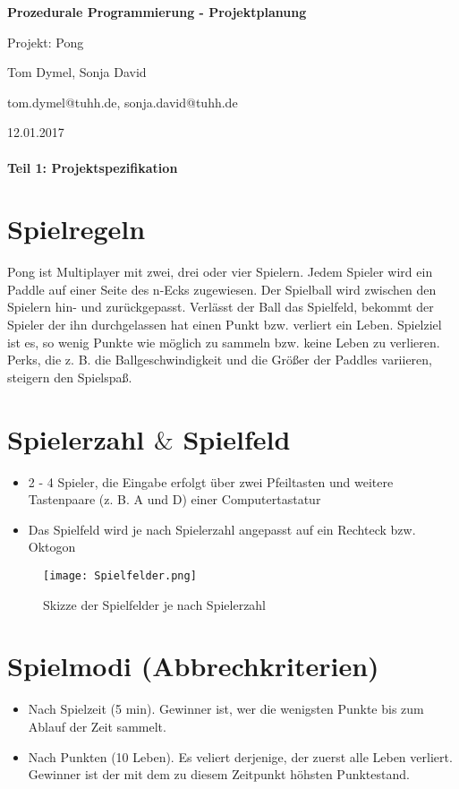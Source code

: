 \documentclass[a4paper, 10pt]{article}
\begin{document}
\begin{center}
{\Large\bf Prozedurale Programmierung - Projektplanung}\bigskip

{\large Projekt: Pong}\medskip

{\large Tom Dymel, Sonja David}\medskip

{\large tom.dymel@tuhh.de, sonja.david@tuhh.de}\medskip

{\normalsize 12.01.2017}\medskip
\end{center} 

\paragraph {\Large\bf  Teil 1: Projektspezifikation} 
\section{Spielregeln}
Pong ist Multiplayer mit zwei, drei oder vier Spielern. Jedem Spieler wird ein Paddle auf einer Seite des n-Ecks zugewiesen. Der Spielball wird zwischen den Spielern hin- und zurückgepasst. Verlässt der Ball das Spielfeld, bekommt der Spieler der ihn durchgelassen hat einen Punkt bzw. verliert ein Leben. Spielziel ist es, so wenig Punkte wie möglich zu sammeln bzw. keine Leben zu verlieren. Perks, die z. B. die Ballgeschwindigkeit und die Größer der Paddles variieren, steigern den Spielspaß.

\section{Spielerzahl $\&$ Spielfeld}
\begin{itemize}
\item 2 - 4 Spieler, die Eingabe erfolgt über zwei Pfeiltasten und weitere Tastenpaare (z. B. A und D) einer Computertastatur
\item Das Spielfeld wird je nach Spielerzahl angepasst auf ein Rechteck bzw. Oktogon
\end{itemize}

\begin{figure}[h]
\begin{center}
\texttt{[image: Spielfelder.png]}
\caption{Skizze der Spielfelder je nach Spielerzahl}
\label{Spielfelder}
\end{center}
\end{figure}

\section{Spielmodi (Abbrechkriterien)}
\begin{itemize}
\item Nach Spielzeit (5 min). Gewinner ist, wer die wenigsten Punkte bis zum Ablauf der Zeit sammelt.
\item Nach Punkten (10 Leben). Es veliert derjenige, der zuerst alle Leben verliert. Gewinner ist der mit dem zu diesem Zeitpunkt höhsten Punktestand.
\end{itemize}
\end{document}

